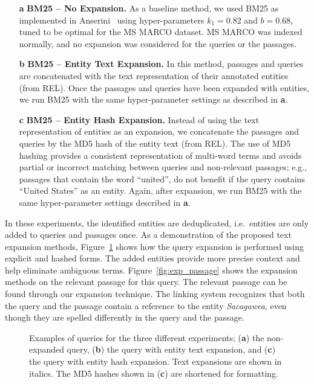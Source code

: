 \begin{itemize}
	\item[\textbf{a}] \textbf{BM25 -- No Expansion.} As a baseline method, we used BM25 as implemented in Anserini~\citep{anserini} using hyper-parameters $k_1=0.82$ and $b=0.68$, tuned to be optimal for the MS MARCO dataset. MS MARCO was indexed normally, and no expansion was considered for the queries or the passages. 
	\item[\textbf{b}] \textbf{BM25 -- Entity Text Expansion.} In this method, passages and queries are concatenated with the text representation of their annotated entities (from REL). Once the passages and queries have been expanded with entities, we run BM25 with the same hyper-parameter settings as described in \textbf{a}.
	\item[\textbf{c}] \textbf{BM25 -- Entity Hash Expansion.} Instead of using the text representation of entities as an expansion, we concatenate the passages and queries by the MD5 hash of the entity text (from REL). The use of MD5 hashing provides a consistent representation of multi-word terms and avoids partial or incorrect matching between queries and non-relevant passages; e.g., passages that contain the word ``united'', do not benefit if the query contains ``United States'' as an entity. Again, after expansion, we run BM25 with the same hyper-parameter settings described in \textbf{a}.
\end{itemize}
In these experiments, the identified entities are deduplicated, i.e.\ entities are only added to queries and passages once. As a demonstration of the proposed text expansion methods, Figure~\ref{fig:exp_queries} shows how the query expansion is performed using explicit and hashed forms. The added entities provide more precise context and help eliminate ambiguous terms. Figure~\ref{fig:exp_passage} shows the expansion methods on the relevant passage for this query. The relevant passage can be found through our expansion technique. The linking system recognizes that both the query and the passage contain a reference to the entity \emph{Sacagawea}, even though they are spelled differently in the query and the passage.

\begin{figure}
	\caption{Examples of queries for the three different experiments; (\textbf{a}) the non-expanded query, (\textbf{b}) the query with entity text expansion, and (\textbf{c}) the query with entity hash expansion. Text expansions are shown in italics. The MD5 hashes shown in (\textbf{c}) are shortened for formatting.}
	\label{fig:exp_queries}
\end{figure}

